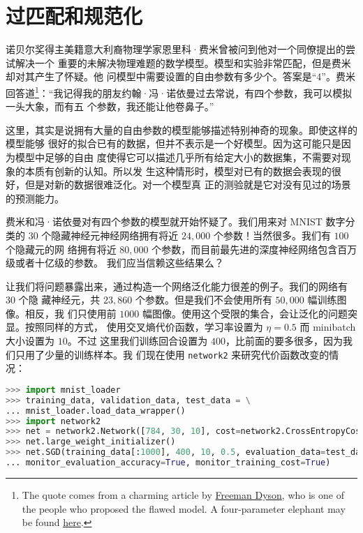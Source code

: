\section{过匹配和规范化}
\label{sec:overfitting_and_regularization}

诺贝尔奖得主美籍意大利裔物理学家恩里科·费米曾被问到他对一个同僚提出的尝试解决一个
重要的未解决物理难题的数学模型。模型和实验非常匹配，但是费米却对其产生了怀疑。他
问模型中需要设置的自由参数有多少个。答案是``4''。费米回答道\footnote{The quote
  comes from a charming article by
  \href{http://www.nature.com/nature/journal/v427/n6972/full/427297a.html}{Freeman
    Dyson}, who is one of the people who proposed the flawed model. A
  four-parameter elephant may be found
  \href{http://www.johndcook.com/blog/2011/06/21/how-to-fit-an-elephant/}{here}.
}：“我记得我的朋友约翰·冯·诺依曼过去常说，有四个参数，我可以模拟一头大象，而有五
个参数，我还能让他卷鼻子。”

这里，其实是说拥有大量的自由参数的模型能够描述特别神奇的现象。即使这样的模型能够
很好的拟合已有的数据，但并不表示是一个好模型。因为这可能只是因为模型中足够的自由
度使得它可以描述几乎所有给定大小的数据集，不需要对现象的本质有创新的认知。所以发
生这种情形时，模型对已有的数据会表现的很好，但是对新的数据很难泛化。对一个模型真
正的测验就是它对没有见过的场景的预测能力。

费米和冯·诺依曼对有四个参数的模型就开始怀疑了。我们用来对 MNIST 数字分类的 $30$
个隐藏神经元神经网络拥有将近 $24,000$ 个参数！当然很多。我们有 $100$ 个隐藏元的网
络拥有将近 $80,000$ 个参数，而目前最先进的深度神经网络包含百万级或者十亿级的参数。
我们应当信赖这些结果么？

让我们将问题暴露出来，通过构造一个网络泛化能力很差的例子。我们的网络有 $30$ 个隐
藏神经元，共 $23,860$ 个参数。但是我们不会使用所有 $50,000$ 幅训练图像。相反，我
们只使用前 $1000$ 幅图像。使用这个受限的集合，会让泛化的问题突显。按照同样的方式，
使用交叉熵代价函数，学习率设置为 $\eta = 0.5$ 而 minibatch 大小设置为 $10$。不过
这里我们训练回合设置为 $400$，比前面的要多很多，因为我们只用了少量的训练样本。我
们现在使用 \lstinline!network2! 来研究代价函数改变的情况：

\begin{lstlisting}[language=Python]
>>> import mnist_loader
>>> training_data, validation_data, test_data = \
... mnist_loader.load_data_wrapper()
>>> import network2
>>> net = network2.Network([784, 30, 10], cost=network2.CrossEntropyCost)
>>> net.large_weight_initializer()
>>> net.SGD(training_data[:1000], 400, 10, 0.5, evaluation_data=test_data,
... monitor_evaluation_accuracy=True, monitor_training_cost=True)
\end{lstlisting}

